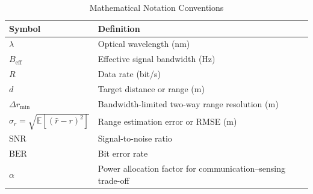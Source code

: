\begin{table}[!t]
    \caption{Mathematical Notation Conventions}
    \label{tab:math_notation}
    \centering
    \footnotesize
    \begin{tabularx}{\columnwidth}{@{}>{\raggedright\arraybackslash}p{} >{\raggedright\arraybackslash}X@{}}
        \toprule
        \textbf{Symbol}                                & \textbf{Definition}                                          \\
        \midrule
        $\lambda$                                      & Optical wavelength (nm)                                      \\
        $B_{\mathrm{eff}}$                             & Effective signal bandwidth (Hz)                              \\
        $R$                                            & Data rate (bit/s)                                            \\
        $d$                                            & Target distance or range (m)                                 \\
        $\Delta r_{\min}$                              & Bandwidth-limited two-way range resolution (m)               \\
        $\sigma_r = \sqrt{\mathbb{E}[(\hat r - r)^2]}$ & Range estimation error or RMSE (m)                           \\
        $\mathrm{SNR}$                                 & Signal-to-noise ratio                                        \\
        $\mathrm{BER}$                                 & Bit error rate                                               \\
        $\alpha$                                       & Power allocation factor for communication--sensing trade-off \\
        \bottomrule
    \end{tabularx}
\end{table}

